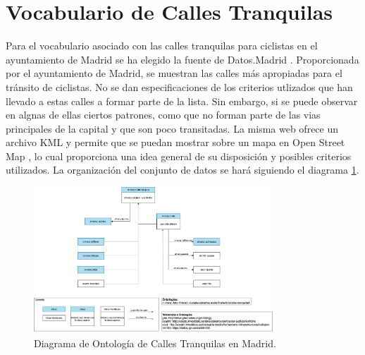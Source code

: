 \section{Vocabulario de Calles Tranquilas}

Para el vocabulario asociado con las calles tranquilas para ciclistas en el ayuntamiento de Madrid se ha elegido la fuente de Datos.Madrid \cite{datosMadrid_callesTranquilas}.
Proporcionada por el ayuntamiento de Madrid, se muestran las calles más apropiadas para el tránsito de ciclistas. No se dan especificaciones de los criterios utlizados que han llevado a estas calles a formar parte de la lista. Sin embargo, si se puede observar en algnas de ellas ciertos patrones, como que no forman parte de las vias principales de la capital y que son poco transitadas. La misma web ofrece un archivo KML y permite que se puedan mostrar sobre un mapa en Open Street Map \cite{openStreetMapCallesTranquilas}, lo cual proporciona una idea general de su disposición y posibles criterios utilizados.
\newline
\newline
La organización del conjunto de datos se hará siguiendo el diagrama \ref{fig:diagramaOntologCallTranq}.

\begin{figure}[h]
	\centering
		\includegraphics[angle=0, width=0.8\textwidth]{images/diagramaCallesTranqui.png}  
	\caption{Diagrama de Ontología de Calles Tranquilas en Madrid.}
	\label{fig:diagramaOntologCallTranq}
\end{figure}


